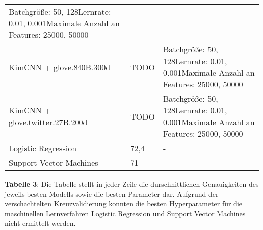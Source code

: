 \documentclass[11pt]{article}
\begin{document}
\begin{longtable}[]{@{}lll@{}}
\begin{minipage}[t]{0.70\columnwidth}
Batchgröße: 50, 128Lernrate: 0.01, 0.001Maximale Anzahl an Features:
25000, 50000\strut
\end{minipage}\tabularnewline
\begin{minipage}[t]{0.14\columnwidth}\raggedright
KimCNN + glove.840B.300d\strut
\end{minipage} & \begin{minipage}[t]{0.07\columnwidth}\raggedright
TODO\strut
\end{minipage} & \begin{minipage}[t]{0.70\columnwidth}\raggedright
Batchgröße: 50, 128Lernrate: 0.01, 0.001Maximale Anzahl an Features:
25000, 50000\strut
\end{minipage}\tabularnewline
\begin{minipage}[t]{0.14\columnwidth}\raggedright
KimCNN + glove.twitter.27B.200d\strut
\end{minipage} & \begin{minipage}[t]{0.07\columnwidth}\raggedright
TODO\strut
\end{minipage} & \begin{minipage}[t]{0.70\columnwidth}\raggedright
Batchgröße: 50, 128Lernrate: 0.01, 0.001Maximale Anzahl an Features:
25000, 50000\strut
\end{minipage}\tabularnewline
\begin{minipage}[t]{0.14\columnwidth}\raggedright
Logistic Regression\strut
\end{minipage} & \begin{minipage}[t]{0.07\columnwidth}\raggedright
72,4\strut
\end{minipage} & \begin{minipage}[t]{0.70\columnwidth}\raggedright
-\strut
\end{minipage}\tabularnewline
\begin{minipage}[t]{0.14\columnwidth}\raggedright
Support Vector Machines\strut
\end{minipage} & \begin{minipage}[t]{0.07\columnwidth}\raggedright
71\strut
\end{minipage} & \begin{minipage}[t]{0.70\columnwidth}\raggedright
-\strut
\end{minipage}\tabularnewline
\bottomrule
\end{longtable}

\textbf{Tabelle 3}: Die Tabelle stellt in jeder Zeile die
durschnittlichen Genauigkeiten des jeweils besten Modells sowie die
besten Parameter dar. Aufgrund der verschachtelten Kreuzvalidierung
konnten die besten Hyperparameter für die maschinellen Lernverfahren
Logistic Regression und Support Vector Machines nicht ermittelt werden.
\end{document}
